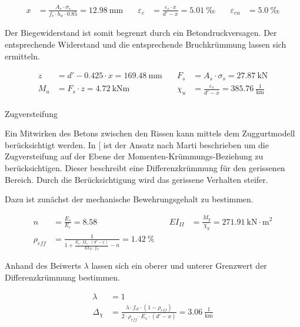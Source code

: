\documentclass[
  11pt,
  letterpaper,
]{scrreprt}
\makeatletter
\let\oldparagraph\paragraph
\renewcommand{\paragraph}{
    \@ifstar
      \xxxParagraphStar
      \xxxParagraphNoStar
  }
\newcommand{\xxxParagraphStar}[1]{\oldparagraph*{#1}\mbox{}}
\newcommand{\xxxParagraphNoStar}[1]{\oldparagraph{#1}\mbox{}}
\makeatother
\begin{document}
\[
\begin{aligned}
x& = \frac{A_{s} \cdot \sigma_{s}}{f_{c} \cdot b_{w} \cdot 0.85} = 12.98 \ \mathrm{mm} \quad & \varepsilon_{c}& = \frac{\varepsilon_{s} \cdot x}{{d}' - x} = 5.01 \ \mathrm{‰} \quad & \varepsilon_{cu}& = 5.0 \ \mathrm{‰} \end{aligned}
\]

Der Biegewiderstand ist somit begrenzt durch ein Betondruckversagen. Der
entsprechende Widerstand und die entsprechende Bruchkrümmung lassen sich
ermitteln.

\[
\begin{aligned}
z& = {d}' - 0.425 \cdot x = 169.48 \ \mathrm{mm} \quad & F_{s}& = A_{s} \cdot \sigma_{s} = 27.87 \ \mathrm{kN} \\ 
M_{u}& = F_{s} \cdot z = 4.72 \ \mathrm{kNm} \quad & \chi_{u}& = \frac{\varepsilon_{s}}{{d}' - x} = 385.76 \ \frac{1}{\mathrm{km}} \end{aligned}
\]

\paragraph{Zugversteifung}\label{zugversteifung}

Ein Mitwirken des Betons zwischen den Rissen kann mittels dem
Zuggurtmodell berücksichtigt werden. In
{[}\citeproc{ref-spathelf_gebrauchstauglichkeit_2022}{4}{]} ist der
Ansatz nach Marti beschrieben um die Zugversteifung auf der Ebene der
Momenten-Krümmungs-Beziehung zu berücksichtigen. Dieser beschreibt eine
Differenzkrümmung für den gerissenen Bereich. Durch die Berücksichtigung
wird das gerissene Verhalten steifer.

Dazu ist zunächst der mechanische Bewehrungsgehalt zu bestimmen.

\[
\begin{aligned}
n& = \frac{E_{s}}{E_{c}} = 8.58 \  \quad & EI_{II}& = \frac{M_{y}}{\chi_{y}} = 271.91 \ \mathrm{kN} \cdot \mathrm{m}^{2} \\ 
\rho_{eff}& = \frac{1}{1 + \frac{E_{s} \cdot M_{r} \cdot \left({d}' - x\right)}{EI_{II} \cdot f_{ct}} - n} = 1.42 \ \mathrm{\%} \quad &  
 \end{aligned}
\]

Anhand des Beiwerts \(\lambda\) lassen sich ein oberer und unterer
Grenzwert der Differenzkrümmung bestimmen.

\[
\begin{aligned}
\lambda& = 1 \\ 
\Delta_{\chi}& = \frac{\lambda \cdot f_{ct} \cdot \left(1 - \rho_{eff}\right)}{2 \cdot \rho_{eff} \cdot E_{s} \cdot \left({d}' - x\right)} = 3.06 \ \frac{1}{\mathrm{km}} \end{aligned}
\]
\end{document}
